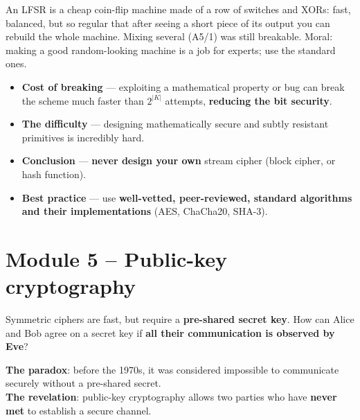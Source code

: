 \begin{goatbox}
An LFSR is a cheap coin-flip machine made of a row of switches and XORs: fast, balanced, but so
regular that after seeing a short piece of its output you can rebuild the whole machine. Mixing
several (A5/1) was still breakable. Moral: making a good random-looking machine is a job for
experts; use the standard ones.
\end{goatbox}

\begin{keybox}[title=Bit security and consequences]
\begin{itemize}
  \item \textbf{Cost of breaking} --- exploiting a mathematical property or bug can break
        the scheme much faster than $2^{|K|}$ attempts, \textbf{reducing the bit
        security}.
  \item \textbf{The difficulty} --- designing mathematically secure and subtly resistant
        primitives is incredibly hard.
  \item \textbf{Conclusion} --- \textbf{never design your own} stream cipher (block
        cipher, or hash function).
  \item \textbf{Best practice} --- use \textbf{well-vetted, peer-reviewed, standard
        algorithms and their implementations} (AES, ChaCha20, SHA-3).
\end{itemize}
\end{keybox}

\section{Module 5 -- Public-key cryptography}

\begin{defnbox}[title=Key distribution problem]
Symmetric ciphers are fast, but require a \textbf{pre-shared secret key}. How can Alice
and Bob agree on a secret key if \textbf{all their communication is observed by Eve}?
\end{defnbox}

\begin{defnbox}[title=Public-key (asymmetric) cryptography]
\textbf{The paradox}: before the 1970s, it was considered impossible to communicate
securely without a pre-shared secret. \\
\textbf{The revelation}: public-key cryptography allows two parties who have
\textbf{never met} to establish a secure channel.
\end{defnbox}

